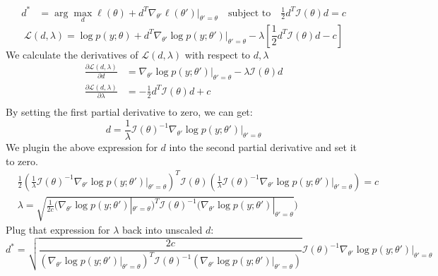 \begin{answer}
\begin{align*}
d^* &= \arg\max_d \ell(\theta) + d^T\nabla_{\theta'}\ell(\theta')|_{\theta'=\theta} \quad \text{subject to} \quad 
\frac{1}{2}d^T \mathcal{I}(\theta) d = c
\end{align*}
\[\mathcal{L}(d, \lambda) = \log p(y; \theta) + d^T\nabla_{\theta'}\log p(y; \theta')|_{\theta'=\theta} - \lambda  [\frac{1}{2}d^T \mathcal{I}(\theta) d - c]\]
We calculate the derivatives of $\mathcal{L}(d, \lambda)$ with respect to $d, \lambda$
\begin{align*}
    \frac{\partial \mathcal{L}(d, \lambda)}{\partial d} &= \nabla_{\theta'}\log p(y; \theta')|_{\theta'=\theta} - \lambda \mathcal{I}(\theta) d\\
    \frac{\partial \mathcal{L}(d, \lambda)}{\partial \lambda} &= -\frac{1}{2}d^T \mathcal{I}(\theta) d + c\\
\end{align*}
By setting the first partial derivative to zero, we can get:
$$d = \frac{1}{\lambda} \mathcal{I}(\theta)^{-1} \nabla_{\theta'}\log p(y; \theta')|_{\theta'=\theta}$$
We plugin the above expression for $d$ into the second partial derivative and set it to zero.
\begin{align*}
    &\frac{1}{2}(\frac{1}{\lambda} \mathcal{I}(\theta)^{-1} \nabla_{\theta'}\log p(y; \theta')|_{\theta'=\theta})^T \mathcal{I}(\theta) (\frac{1}{\lambda} \mathcal{I}(\theta)^{-1} \nabla_{\theta'}\log p(y; \theta')|_{\theta'=\theta}) = c\\
    &\lambda = \sqrt{\frac{1}{2c} (\nabla_{\theta'}\log p(y; \theta')|_{\theta'=\theta})^T \mathcal{I}(\theta)^{-1} (\nabla_{\theta'}\log p(y; \theta')|_{\theta'=\theta}})
\end{align*}
Plug that expression for $\lambda$ back into unscaled $d$:
$$d^* = \sqrt{\frac{2c}{(\nabla_{\theta'}\log p(y; \theta')|_{\theta'=\theta})^T \mathcal{I}(\theta)^{-1} (\nabla_{\theta'}\log p(y; \theta')|_{\theta'=\theta})}} \mathcal{I}(\theta)^{-1} \nabla_{\theta'}\log p(y; \theta')|_{\theta'=\theta}$$
\end{answer}
